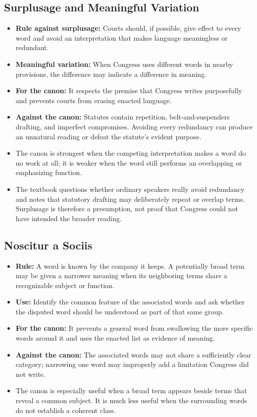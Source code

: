\documentclass[11pt]{tex/lawoutline}
\begin{document}
\subsection{Surplusage and Meaningful Variation}

\begin{itemize}
    \item \textbf{Rule against surplusage:} Courts should, if possible, give effect to every word and avoid an interpretation that makes language meaningless or redundant.
    \item \textbf{Meaningful variation:} When Congress uses different words in nearby provisions, the difference may indicate a difference in meaning.
    \item \textbf{For the canon:} It respects the premise that Congress writes purposefully and prevents courts from erasing enacted language.
    \item \textbf{Against the canon:} Statutes contain repetition, belt-and-suspenders drafting, and imperfect compromises. Avoiding every redundancy can produce an unnatural reading or defeat the statute's evident purpose.
    \item The canon is strongest when the competing interpretation makes a word do no work at all; it is weaker when the word still performs an overlapping or emphasizing function.
    \item The textbook questions whether ordinary speakers really avoid redundancy and notes that statutory drafting may deliberately repeat or overlap terms. Surplusage is therefore a presumption, not proof that Congress could not have intended the broader reading.
\end{itemize}

\subsection{Noscitur a Sociis}

\begin{itemize}
    \item \textbf{Rule:} A word is known by the company it keeps. A potentially broad term may be given a narrower meaning when its neighboring terms share a recognizable subject or function.
    \item \textbf{Use:} Identify the common feature of the associated words and ask whether the disputed word should be understood as part of that same group.
    \item \textbf{For the canon:} It prevents a general word from swallowing the more specific words around it and uses the enacted list as evidence of meaning.
    \item \textbf{Against the canon:} The associated words may not share a sufficiently clear category; narrowing one word may improperly add a limitation Congress did not write.
    \item The canon is especially useful when a broad term appears beside terms that reveal a common subject. It is much less useful when the surrounding words do not establish a coherent class.
\end{itemize}
\end{document}
